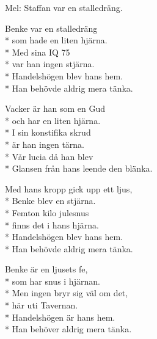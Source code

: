\begin{SongText}
    \begin{SongVerse}
        Mel: Staffan var en stalledräng.
    \end{SongVerse}
    \begin{SongVerse}
        Benke var en stalledräng\\*%
        som hade en liten hjärna.\\*%
        Med sina IQ 75\\*%
        var han ingen stjärna.\\*%
        Handelshögen blev hans hem.\\*%
        Han behövde aldrig mera tänka.
    \end{SongVerse}
    \begin{SongVerse}
        Vacker är han som en Gud\\*%
        och har en liten hjärna.\\*%
        I sin konstifika skrud\\*%
        är han ingen tärna.\\*%
        Vår lucia då han blev\\*%
        Glansen från hans leende den blänka.
    \end{SongVerse}
    \begin{SongVerse}
        Med hans kropp gick upp ett ljus,\\*%
        Benke blev en stjärna.\\*%
        Femton kilo julesnus\\*%
        finns det i hans hjärna.\\*%
        Handelshögen blev hans hem.\\*%
        Han behövde aldrig mera tänka.
    \end{SongVerse}
    \begin{SongVerse}
        Benke är en ljusets fe,\\*%
        som har snus i hjärnan.\\*%
        Men ingen bryr sig väl om det,\\*%
        här uti Tavernan.\\*%
        Handelshögen är hans hem.\\*%
        Han behöver aldrig mera tänka.
    \end{SongVerse}
    \begin{SongVerse}
    \end{SongVerse}
\end{SongText}